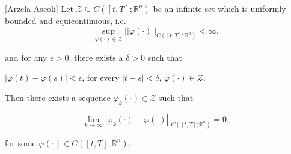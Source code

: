 \begin{theorem}\label{AAT}[Arzela-Ascoli]
	Let $\mathcal{Z}\subseteq C([t,T];\mathbb{R}^n)$ be an infinite set which is uniformly bounded and equicontinuous, i.e.
	$$\sup_{\varphi(\cdot)\in \mathcal{Z}}||\varphi(\cdot)||_{C([t,T];\mathbb{R}^n)}<\infty,$$
	
	and for any $\epsilon>0$, there exists a $\delta>0$ such that 
	\begin{center}
		$|\varphi(t)-\varphi(s)|<\epsilon$, for every $|t-s|<\delta$, $\varphi(\cdot)\in \mathcal{Z}$.
	\end{center}
	
	Then there exists a sequence $\varphi_k(\cdot)\in \mathcal{Z}$ such that 
	
	$$\lim_{k\rightarrow \infty}|\varphi_k(\cdot)-\bar{\varphi}(\cdot)||_{C([t,T];\mathbb{R}^n)}=0,$$

for some $\bar{\varphi}(\cdot) \in C([t,T];\mathbb{R}^n)$.	
\end{theorem}

